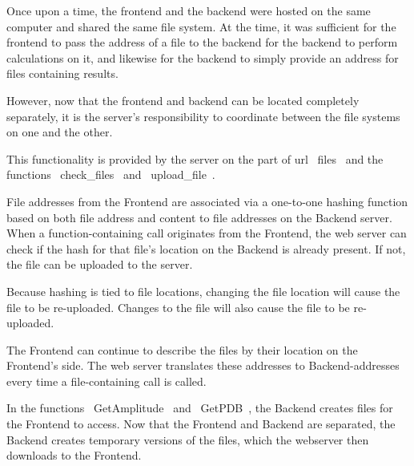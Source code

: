 \documentclass[12pt]{article}
\begin{document}
Once upon a time, the frontend and the backend were hosted on the same computer and shared the same file system. At the time, it was sufficient for the frontend to pass the address of a file to the backend for the backend to perform calculations on it, and likewise for the backend to simply provide an address for files containing results.

However, now that the frontend and backend can be located completely separately, it is the server's responsibility to coordinate between the file systems on one and the other. 

This functionality is provided by the server on the part of url ~files~ and the functions ~check_files~ and ~upload_file~. 

File addresses from the Frontend are associated via a one-to-one hashing function based on both file address and content to file addresses on the Backend server. When a function-containing call originates from the Frontend, the web server can check if the hash for that file's location on the Backend is already present. If not, the file can be uploaded to the server. 

Because hashing is tied to file locations, changing the file location will cause the file to be re-uploaded. Changes to the file will also cause the file to be re-uploaded.

The Frontend can continue to describe the files by their location on the Frontend's side. The web server translates these addresses to Backend-addresses every time a file-containing call is called.

In the functions ~GetAmplitude~ and ~GetPDB~, the Backend creates files for the Frontend to access. Now that the Frontend and Backend are separated, the Backend creates temporary versions of the files, which the webserver then downloads to the Frontend.
\end{document}
